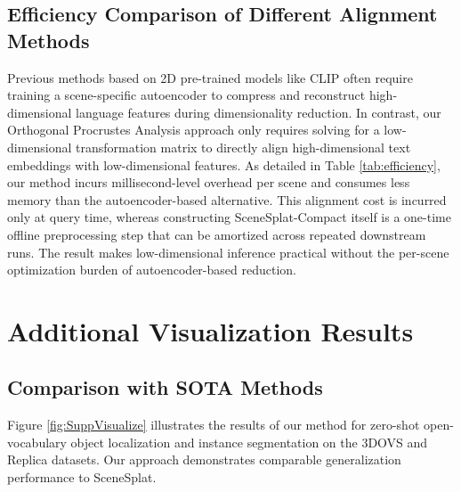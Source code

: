 \subsection{Efficiency Comparison of Different Alignment Methods}
Previous methods \cite{cheng2024occamslgssimpleapproach, qin2024langsplat, li2025langsplatv2} based on 2D pre-trained models like CLIP \cite{DBLP:journals/corr/abs-2103-00020} often require training a scene-specific autoencoder to compress and reconstruct high-dimensional language features during dimensionality reduction. In contrast, our Orthogonal Procrustes Analysis approach only requires solving for a low-dimensional transformation matrix to directly align high-dimensional text embeddings with low-dimensional features.
As detailed in Table \ref{tab:efficiency}, our method incurs millisecond-level overhead per scene and consumes less memory than the autoencoder-based alternative. This alignment cost is incurred only at query time, whereas constructing SceneSplat-Compact itself is a one-time offline preprocessing step that can be amortized across repeated downstream runs. The result makes low-dimensional inference practical without the per-scene optimization burden of autoencoder-based reduction.


\section{Additional Visualization Results}
\label{sec:add_vis}

\subsection{Comparison with SOTA Methods}
Figure \ref{fig:SuppVisualize} illustrates the results of our method for zero-shot open-vocabulary object localization and instance segmentation on the 3DOVS\cite{liu2023weakly} and Replica\cite{straub2019replica} datasets. Our approach demonstrates comparable generalization performance to SceneSplat.


